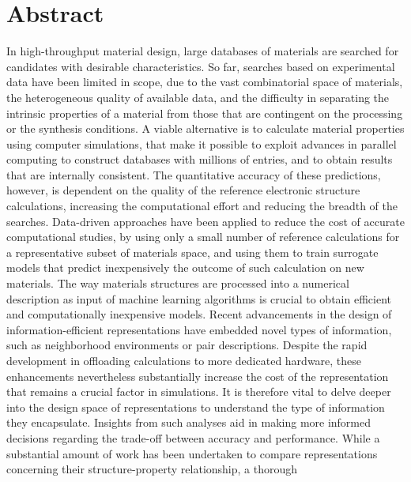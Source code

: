 
\chapter*{Abstract}
In high-throughput material design, large databases of materials are searched
for candidates with desirable characteristics. So far, searches based on
experimental data have been limited in scope, due to the vast combinatorial
space of materials, the heterogeneous quality of available data, and the
difficulty in separating the intrinsic properties of a material from those that
are contingent on the processing or the synthesis conditions. A viable
alternative is to calculate material properties using computer simulations,
that make it possible to exploit advances in parallel computing to construct
databases with millions of entries, and to obtain results that are internally
consistent. The quantitative accuracy of these predictions, however, is
dependent on the quality of the reference electronic structure calculations,
increasing the computational effort and reducing the breadth of the searches.
Data-driven approaches have been applied to reduce the cost of accurate
computational studies, by using only a small number of reference calculations
for a representative subset of materials space, and using them to train
surrogate models that predict inexpensively the outcome of such calculation on
new materials. The way materials structures are processed into a numerical
description as input of machine learning algorithms is crucial to obtain
efficient and computationally inexpensive models.  Recent advancements in the
design of information-efficient representations have embedded novel types of
information, such as neighborhood environments or pair descriptions.  Despite
the rapid development in offloading calculations to more dedicated hardware,
these enhancements nevertheless substantially increase the cost of the
representation that remains a crucial factor in simulations.  It is therefore
vital to delve deeper into the design space of representations to understand
the type of information they encapsulate.  Insights from such analyses aid in
making more informed decisions regarding the trade-off between accuracy and
performance.  While a substantial amount of work has been undertaken to compare
representations concerning their structure-property relationship, a thorough

